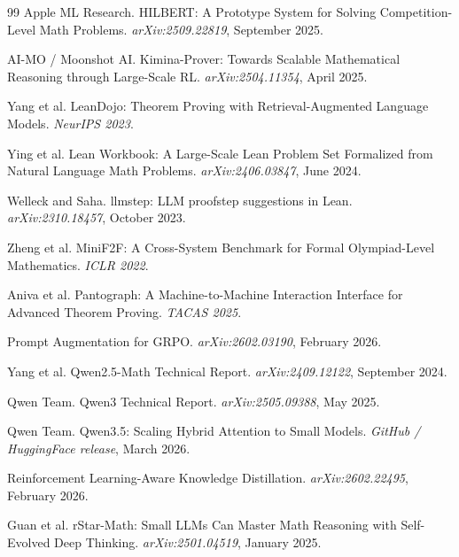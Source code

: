 \documentclass[11pt,a4paper]{article}
\begin{document}
\begin{thebibliography}{99}
Apple ML Research.
\newblock HILBERT: A Prototype System for Solving Competition-Level Math Problems.
\newblock \emph{arXiv:2509.22819}, September 2025.

AI-MO / Moonshot AI.
\newblock Kimina-Prover: Towards Scalable Mathematical Reasoning through Large-Scale RL.
\newblock \emph{arXiv:2504.11354}, April 2025.

Yang et al.
\newblock LeanDojo: Theorem Proving with Retrieval-Augmented Language Models.
\newblock \emph{NeurIPS 2023}.

Ying et al.
\newblock Lean Workbook: A Large-Scale Lean Problem Set Formalized from Natural Language Math Problems.
\newblock \emph{arXiv:2406.03847}, June 2024.

Welleck and Saha.
\newblock llmstep: LLM proofstep suggestions in Lean.
\newblock \emph{arXiv:2310.18457}, October 2023.

Zheng et al.
\newblock MiniF2F: A Cross-System Benchmark for Formal Olympiad-Level Mathematics.
\newblock \emph{ICLR 2022}.

Aniva et al.
\newblock Pantograph: A Machine-to-Machine Interaction Interface for Advanced Theorem Proving.
\newblock \emph{TACAS 2025}.

Prompt Augmentation for GRPO.
\newblock \emph{arXiv:2602.03190}, February 2026.

Yang et al.
\newblock Qwen2.5-Math Technical Report.
\newblock \emph{arXiv:2409.12122}, September 2024.

Qwen Team.
\newblock Qwen3 Technical Report.
\newblock \emph{arXiv:2505.09388}, May 2025.

Qwen Team.
\newblock Qwen3.5: Scaling Hybrid Attention to Small Models.
\newblock \emph{GitHub / HuggingFace release}, March 2026.

Reinforcement Learning-Aware Knowledge Distillation.
\newblock \emph{arXiv:2602.22495}, February 2026.

Guan et al.
\newblock rStar-Math: Small LLMs Can Master Math Reasoning with Self-Evolved Deep Thinking.
\newblock \emph{arXiv:2501.04519}, January 2025.


\end{thebibliography}
\end{document}

